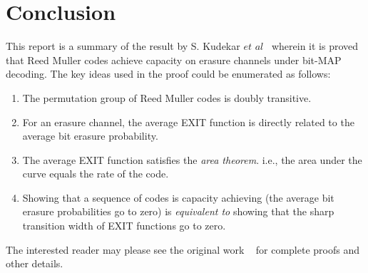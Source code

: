 \documentclass[
10pt, %
a4paper, %
oneside, %
headinclude,footinclude, %
BCOR5mm, %
]{scrartcl}
\begin{document}
\section{Conclusion}
\par This report is a summary of the result by S. Kudekar $et$ $al$~\cite{rm12} wherein it is proved that Reed Muller codes achieve capacity on erasure channels under bit-MAP decoding. The key ideas used in the proof could be enumerated as follows:
\begin{enumerate}
\item The permutation group of Reed Muller codes is doubly transitive.
\item For an erasure channel, the average EXIT function is directly related to the average bit erasure probability.
\item The average EXIT function satisfies the \emph{area theorem}. i.e., the area under the curve equals the rate of the code.
\item Showing that a sequence of codes is capacity achieving (the average bit erasure probabilities go to zero) is \emph{equivalent to} showing that the sharp transition width of EXIT functions go to zero.
\end{enumerate}
The interested reader may please see the original work ~\cite{rm1,rm2,rm12} for complete proofs and other details.


\newpage






\end{document}

